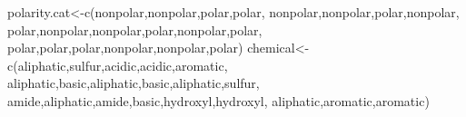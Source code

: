 \documentclass[
]{book}
\newenvironment{Shaded}{\begin{snugshade}}{\end{snugshade}}
\newcommand{\FunctionTok}[1]{\textcolor[rgb]{0.00,0.00,0.00}{#1}}
\newcommand{\NormalTok}[1]{#1}
\newcommand{\OtherTok}[1]{\textcolor[rgb]{0.56,0.35,0.01}{#1}}
\newcommand{\StringTok}[1]{\textcolor[rgb]{0.31,0.60,0.02}{#1}}
\begin{document}
\begin{Shaded}
\begin{Highlighting}[]
\NormalTok{polarity.cat}\OtherTok{\textless{}{-}}\FunctionTok{c}\NormalTok{(}\StringTok{\textquotesingle{}nonpolar\textquotesingle{}}\NormalTok{,}\StringTok{\textquotesingle{}nonpolar\textquotesingle{}}\NormalTok{,}\StringTok{\textquotesingle{}polar\textquotesingle{}}\NormalTok{,}\StringTok{\textquotesingle{}polar\textquotesingle{}}\NormalTok{,}
                \StringTok{\textquotesingle{}nonpolar\textquotesingle{}}\NormalTok{,}\StringTok{\textquotesingle{}nonpolar\textquotesingle{}}\NormalTok{,}\StringTok{\textquotesingle{}polar\textquotesingle{}}\NormalTok{,}\StringTok{\textquotesingle{}nonpolar\textquotesingle{}}\NormalTok{,}
                \StringTok{\textquotesingle{}polar\textquotesingle{}}\NormalTok{,}\StringTok{\textquotesingle{}nonpolar\textquotesingle{}}\NormalTok{,}\StringTok{\textquotesingle{}nonpolar\textquotesingle{}}\NormalTok{,}\StringTok{\textquotesingle{}polar\textquotesingle{}}\NormalTok{,}\StringTok{\textquotesingle{}nonpolar\textquotesingle{}}\NormalTok{,}\StringTok{\textquotesingle{}polar\textquotesingle{}}\NormalTok{,}
                \StringTok{\textquotesingle{}polar\textquotesingle{}}\NormalTok{,}\StringTok{\textquotesingle{}polar\textquotesingle{}}\NormalTok{,}\StringTok{\textquotesingle{}polar\textquotesingle{}}\NormalTok{,}\StringTok{\textquotesingle{}nonpolar\textquotesingle{}}\NormalTok{,}\StringTok{\textquotesingle{}nonpolar\textquotesingle{}}\NormalTok{,}\StringTok{\textquotesingle{}polar\textquotesingle{}}\NormalTok{)}
\NormalTok{chemical}\OtherTok{\textless{}{-}}\FunctionTok{c}\NormalTok{(}\StringTok{\textquotesingle{}aliphatic\textquotesingle{}}\NormalTok{,}\StringTok{\textquotesingle{}sulfur\textquotesingle{}}\NormalTok{,}\StringTok{\textquotesingle{}acidic\textquotesingle{}}\NormalTok{,}\StringTok{\textquotesingle{}acidic\textquotesingle{}}\NormalTok{,}\StringTok{\textquotesingle{}aromatic\textquotesingle{}}\NormalTok{,}
            \StringTok{\textquotesingle{}aliphatic\textquotesingle{}}\NormalTok{,}\StringTok{\textquotesingle{}basic\textquotesingle{}}\NormalTok{,}\StringTok{\textquotesingle{}aliphatic\textquotesingle{}}\NormalTok{,}\StringTok{\textquotesingle{}basic\textquotesingle{}}\NormalTok{,}\StringTok{\textquotesingle{}aliphatic\textquotesingle{}}\NormalTok{,}\StringTok{\textquotesingle{}sulfur\textquotesingle{}}\NormalTok{,}
            \StringTok{\textquotesingle{}amide\textquotesingle{}}\NormalTok{,}\StringTok{\textquotesingle{}aliphatic\textquotesingle{}}\NormalTok{,}\StringTok{\textquotesingle{}amide\textquotesingle{}}\NormalTok{,}\StringTok{\textquotesingle{}basic\textquotesingle{}}\NormalTok{,}\StringTok{\textquotesingle{}hydroxyl\textquotesingle{}}\NormalTok{,}\StringTok{\textquotesingle{}hydroxyl\textquotesingle{}}\NormalTok{,}
            \StringTok{\textquotesingle{}aliphatic\textquotesingle{}}\NormalTok{,}\StringTok{\textquotesingle{}aromatic\textquotesingle{}}\NormalTok{,}\StringTok{\textquotesingle{}aromatic\textquotesingle{}}\NormalTok{)}


\end{Highlighting}
\end{Shaded}
\end{document}
